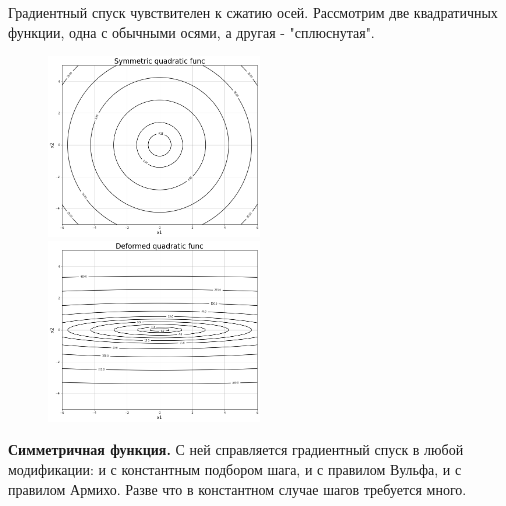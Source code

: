 \documentclass[14pt]{article}
\begin{document}
Градиентный спуск чувствителен к сжатию осей. Рассмотрим две квадратичных функции, одна с обычными осями, а другая - "сплюснутая".

\begin{figure}[h]
	\includegraphics[width=0.5\textwidth]{sym_simple.png}
	\includegraphics[width=0.5\textwidth]{deformed.png}
\end{figure}

\newpage

\textbf{Симметричная функция.}
С ней справляется градиентный спуск в любой модификации: и с константным подбором шага, и с правилом Вульфа, и с правилом Армихо. Разве что в константном случае шагов требуется много.
\end{document}

